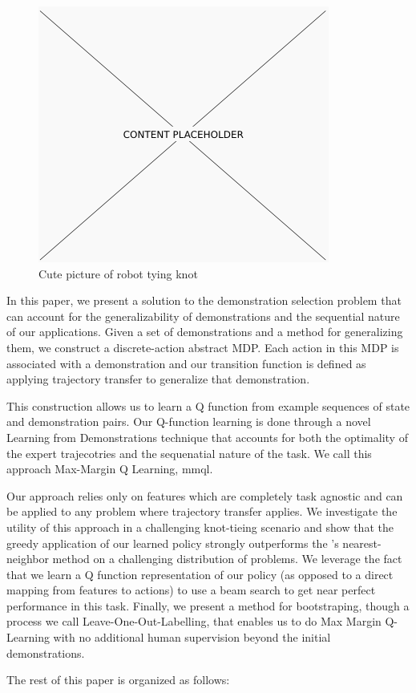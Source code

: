 \begin{figure}[t]
  \centering
    \includegraphics[width=0.9\linewidth]{figures/placeholder.png}
  \caption{Cute picture of robot tying knot}
  \label{fig:frontfig}
\end{figure}

In this paper, we present a solution to the demonstration selection problem that can 
account for the generalizability of demonstrations and the sequential nature of our 
applications.
Given a set of demonstrations and a method for generalizing them, we construct a 
discrete-action abstract MDP.
Each action in this MDP is associated with a demonstration and our transition 
function is defined as applying trajectory transfer to generalize that demonstration.

This construction allows us to learn a Q function from example sequences of 
state and demonstration pairs.
Our Q-function learning is done through a novel Learning from Demonstrations
technique that accounts for both the optimality of the expert trajecotries and the
sequenatial nature of the task.
We call this approach Max-Margin Q Learning, {\sc mmql}.

Our approach relies only on features which are completely task 
agnostic and can be applied to any problem where trajectory transfer applies. 
We investigate the utility of this approach in a challenging knot-tieing scenario 
and show that the greedy application of our learned policy strongly outperforms the 
\citet{Schulmanetal_ISRR2013}'s nearest-neighbor method on a challenging distribution of 
problems. 
We leverage the fact that we learn a Q function representation of our policy (as 
opposed to a direct mapping from features to actions) to use a beam search to get 
near perfect performance in this task.
Finally, we present a method for bootstraping, though a process we call Leave-One-Out-Labelling, that enables us to do Max Margin Q-Learning with no additional human supervision beyond the initial demonstrations.

The rest of this paper is organized as follows: 



